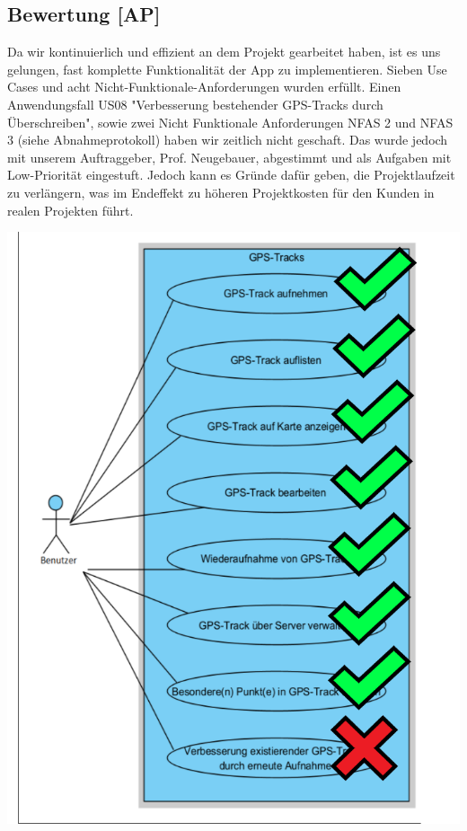\documentclass[10pt]{article}
\begin{document}
\subsection{Bewertung [AP]}
    Da wir kontinuierlich und effizient an dem Projekt gearbeitet haben, ist es uns gelungen, fast komplette Funktionalität der App zu implementieren.
    Sieben Use Cases und  acht Nicht-Funktionale-Anforderungen wurden erfüllt. Einen Anwendungsfall US08 "Verbesserung bestehender GPS-Tracks durch Überschreiben", sowie  
    zwei Nicht Funktionale Anforderungen NFAS 2 und NFAS 3 (siehe Abnahmeprotokoll) haben wir zeitlich nicht geschaft. Das wurde jedoch mit unserem Auftraggeber, Prof. Neugebauer, 
    abgestimmt und als Aufgaben mit Low-Priorität eingestuft.
    Jedoch kann es Gründe dafür geben, die Projektlaufzeit zu verlängern, was im Endeffekt zu höheren Projektkosten für den Kunden in realen Projekten führt.
    \begin{center}
        \includegraphics[scale=0.4]{use_case_comleted.png}
    \end{center}
\end{document}
